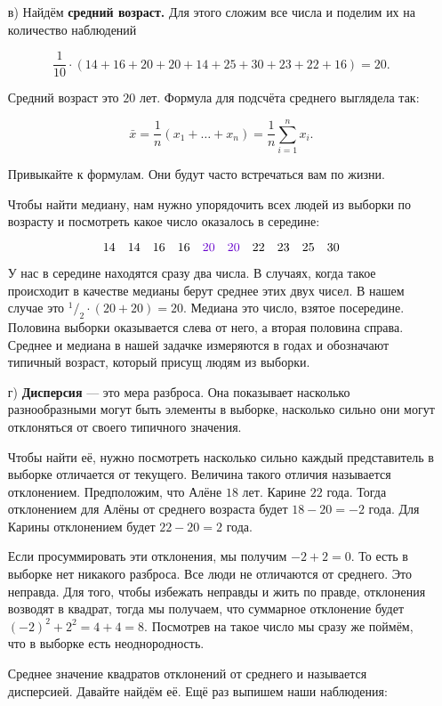 \documentclass[12pt, a4paper, oneside]{article}
\newcommand{\fr}[2]{\ensuremath{^{#1}/_{#2}}}   %
\theoremstyle{plain} %
\theoremstyle{definition}
\newcommand{\indef}[1]{\textbf{ \color{green} #1}}
\begin{document}
\begin{solution}
\begin{enumerate}
	\item[в)]  Найдём \indef{средний возраст.} Для этого сложим все числа и поделим их на количество наблюдений
	
	\[
	\frac{1}{10} \cdot (14 + 16 + 20 + 20 + 14 + 25 + 30 + 23 + 22 + 16) = 20.
	\]
	
	Средний возраст это $20$ лет.  Формула для подсчёта среднего выглядела так:
	
	\[
	\bar x = \frac{1}{n} (x_1 + \ldots + x_n) = \frac{1}{n} \sum_{i=1}^n x_i.
	\]
	
	Привыкайте к формулам. Они будут часто встречаться вам по жизни. 
	
	Чтобы найти медиану, нам нужно упорядочить всех людей из выборки по возрасту и посмотреть какое число оказалось в середине:
	
	\[
	14 \quad 14  \quad 16  \quad 16  \quad {\color{purp}{20}}  \quad {\color{purp}{20}}  \quad 22  \quad 23  \quad 25  \quad 30
	\]
	
	У нас в середине находятся сразу два числа. В случаях, когда такое происходит в качестве медианы берут среднее этих двух чисел. В нашем случае это $\fr{1}{2} \cdot (20 + 20) = 20$. Медиана это число, взятое посередине. Половина выборки оказывается слева от него, а вторая половина справа. Среднее и медиана в нашей задачке измеряются в годах и обозначают типичный возраст, который присущ людям из выборки. 
	
	\item[г)]  \indef{Дисперсия} --- это мера разброса. Она показывает насколько разнообразными могут быть элементы в выборке, насколько сильно они могут отклоняться от своего типичного значения. 
	
	Чтобы найти её, нужно посмотреть насколько сильно каждый представитель в выборке отличается от текущего. Величина такого отличия называется отклонением. Предположим, что Алёне $18$ лет. Карине $22$ года. Тогда отклонением для Алёны от среднего возраста будет $18 - 20 = -2$ года. Для Карины отклонением будет $22 - 20 = 2$ года. 
	
	Если просуммировать эти отклонения, мы получим $-2 + 2 = 0$. То есть в выборке нет никакого разброса. Все люди не отличаются от среднего. Это неправда. Для того, чтобы избежать неправды и жить по правде, отклонения возводят в квадрат, тогда мы получаем, что суммарное отклонение будет $(-2)^2 + 2^2 = 4 + 4 = 8$. Посмотрев на такое число мы сразу же поймём, что в выборке есть неоднородность. 
	
	Среднее значение квадратов отклонений от среднего и называется дисперсией. Давайте найдём её. Ещё раз выпишем наши наблюдения: 
	

\end{enumerate}
\end{solution}
\end{document}
